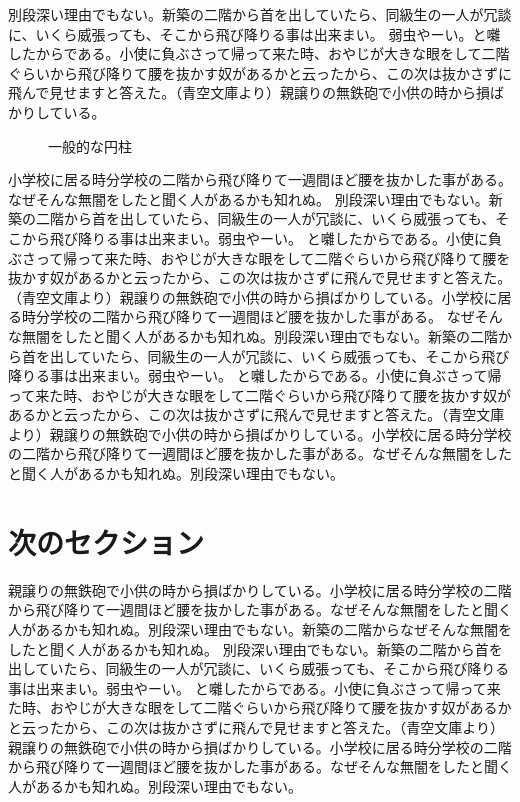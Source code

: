 別段深い理由でもない。新築の二階から首を出していたら、同級生の一人が冗談に、いくら威張っても、そこから飛び降りる事は出来まい。
弱虫やーい。と囃したからである。小使に負ぶさって帰って来た時、おやじが大きな眼をして二階ぐらいから飛び降りて腰を抜かす奴があるかと云ったから、この次は抜かさずに飛んで見せますと答えた。（青空文庫より）親譲りの無鉄砲で小供の時から損ばかりしている。
\begin{figure}[H]
    \centering
    
    \caption{一般的な円柱}
    \label{fig:cylinder}
\end{figure}
小学校に居る時分学校の二階から飛び降りて一週間ほど腰を抜かした事がある。
なぜそんな無闇をしたと聞く人があるかも知れぬ。
別段深い理由でもない。新築の二階から首を出していたら、同級生の一人が冗談に、いくら威張っても、そこから飛び降りる事は出来まい。弱虫やーい。
と囃したからである。小使に負ぶさって帰って来た時、おやじが大きな眼をして二階ぐらいから飛び降りて腰を抜かす奴があるかと云ったから、この次は抜かさずに飛んで見せますと答えた。（青空文庫より）親譲りの無鉄砲で小供の時から損ばかりしている。小学校に居る時分学校の二階から飛び降りて一週間ほど腰を抜かした事がある。
なぜそんな無闇をしたと聞く人があるかも知れぬ。別段深い理由でもない。新築の二階から首を出していたら、同級生の一人が冗談に、いくら威張っても、そこから飛び降りる事は出来まい。弱虫やーい。
と囃したからである。小使に負ぶさって帰って来た時、おやじが大きな眼をして二階ぐらいから飛び降りて腰を抜かす奴があるかと云ったから、この次は抜かさずに飛んで見せますと答えた。（青空文庫より）親譲りの無鉄砲で小供の時から損ばかりしている。小学校に居る時分学校の二階から飛び降りて一週間ほど腰を抜かした事がある。なぜそんな無闇をしたと聞く人があるかも知れぬ。別段深い理由でもない。

\section{次のセクション}
親譲りの無鉄砲で小供の時から損ばかりしている。小学校に居る時分学校の二階から飛び降りて一週間ほど腰を抜かした事がある。なぜそんな無闇をしたと聞く人があるかも知れぬ。別段深い理由でもない。新築の二階からなぜそんな無闇をしたと聞く人があるかも知れぬ。
別段深い理由でもない。新築の二階から首を出していたら、同級生の一人が冗談に、いくら威張っても、そこから飛び降りる事は出来まい。弱虫やーい。
と囃したからである。小使に負ぶさって帰って来た時、おやじが大きな眼をして二階ぐらいから飛び降りて腰を抜かす奴があるかと云ったから、この次は抜かさずに飛んで見せますと答えた。（青空文庫より）親譲りの無鉄砲で小供の時から損ばかりしている。小学校に居る時分学校の二階から飛び降りて一週間ほど腰を抜かした事がある。なぜそんな無闇をしたと聞く人があるかも知れぬ。別段深い理由でもない。

